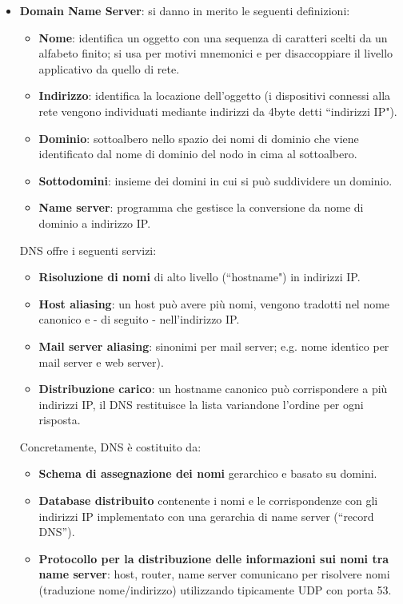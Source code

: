 \documentclass[11pt, italian, openany]{book}
\begin{document}
\begin{sloppypar}
\begin{itemize}[topsep=0pt]
	\item \textbf{Domain Name Server}: si danno in merito le seguenti definizioni:
	\vspace{-3.5mm}
	\begin{itemize}
		\itemsep-0.3em 
		\item \textbf{Nome}: identifica un oggetto con una sequenza di caratteri scelti da un alfabeto finito; si usa per motivi mnemonici e per disaccoppiare
		il livello applicativo da quello di rete.
		\item \textbf{Indirizzo}: identifica la locazione dell'oggetto (i dispositivi connessi alla rete vengono individuati mediante indirizzi da 4byte detti
		``indirizzi IP").
		\item \textbf{Dominio}: sottoalbero nello spazio dei nomi di dominio che viene identificato dal nome di dominio del nodo in cima al sottoalbero.
		\item \textbf{Sottodomini}: insieme dei domini in cui si pu\`o suddividere un dominio.
		\item \textbf{Name server}: programma che gestisce la conversione da nome di dominio a indirizzo IP.
	\end{itemize}


	DNS offre i seguenti servizi:
	\vspace{-3.5mm}
	\begin{itemize}
		\itemsep-0.3em
		\item \textbf{Risoluzione di nomi} di alto livello (``hostname") in indirizzi IP.
		\item \textbf{Host aliasing}: un host può avere più nomi, vengono tradotti nel nome canonico e - di seguito - nell'indirizzo IP.
		\item \textbf{Mail server aliasing}: sinonimi per mail server; e.g. nome identico per mail server e web server).
		\item \textbf{Distribuzione carico}: un hostname canonico può corrispondere a più indirizzi IP, il DNS restituisce la lista variandone l'ordine per
		ogni risposta.
	\end{itemize}

	Concretamente, DNS \`e costituito da:
	\vspace{-3.5mm}
	\begin{itemize}
		\itemsep-0.3em
		\item \textbf{Schema di assegnazione dei nomi} gerarchico e basato su domini.
		\item \textbf{Database distribuito} contenente i nomi e le corrispondenze con gli indirizzi IP implementato con una gerarchia di name server (``record
		DNS'').
		\item \textbf{Protocollo per la distribuzione delle informazioni sui nomi tra name server}: host, router, name server comunicano per risolvere nomi
		(traduzione nome/indirizzo) utilizzando tipicamente UDP con porta 53.
	\end{itemize}


\end{itemize}
\end{sloppypar}
\end{document}

